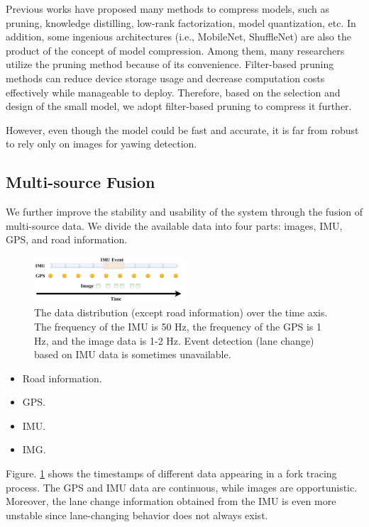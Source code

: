 \documentclass[journal]{IEEEtran}
\begin{document}
Previous works have proposed many methods to compress models, such as pruning, knowledge distilling, low-rank factorization, model quantization, etc. In addition, some ingenious architectures (i.e., MobileNet, ShuffleNet) are also the product of the concept of model compression. Among them, many researchers utilize the pruning method because of its convenience. Filter-based pruning methods can reduce device storage usage and decrease computation costs effectively while manageable to deploy. Therefore, based on the selection and design of the small model, we adopt filter-based pruning to compress it further.

However, even though the model could be fast and accurate, it is far from robust to rely only on images for yawing detection.

\subsection{Multi-source Fusion}
We further improve the stability and usability of the system through the fusion of multi-source data. We divide the available data into four parts: images, IMU, GPS, and road information.

\begin{figure}[htbp]
    \centerline{\includegraphics[width=0.5\textwidth]{fig/data_freq.pdf}}
    \caption{The data distribution (except road information) over the time axis. The frequency of the IMU is 50 Hz, the frequency of the GPS is 1 Hz, and the image data is 1-2 Hz. Event detection (lane change) based on IMU data is sometimes unavailable. }
    \label{fig:data_freq}
\end{figure}
\begin{itemize} 
    \item Road information.
    \item GPS.
    \item IMU.
    \item IMG.
\end{itemize}

Figure. \ref{fig:data_freq} shows the timestamps of different data appearing in a fork tracing process. The GPS and IMU data are continuous, while images are opportunistic. Moreover, the lane change information obtained from the IMU is even more unstable since lane-changing behavior does not always exist. 
\end{document}
